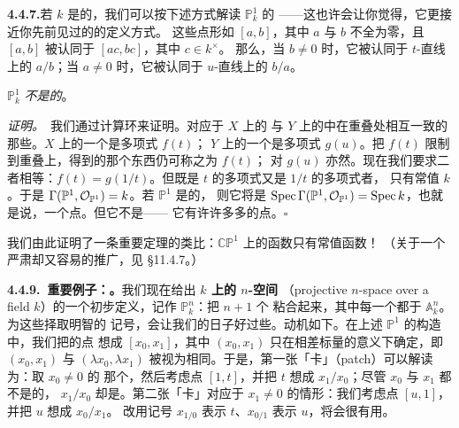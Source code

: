 \textbf{4.4.7.}\quad 若 $k$ 是\trAlgClosed{}的，我们可以按下述方式解读 $\mathbb{P}^1_k$ 的%
\trClosedPoint{}——这也许会让你觉得，它更接近你先前见过的\trProjectiveSpace{}的定义方式。%
这些点形如 $[a,b]$，其中 $a$ 与 $b$ 不全为零，且 $[a,b]$ 被认同于 $[ac,bc]$，其中 $c\in k^{\times}$。%
那么，当 $b\neq 0$ 时，它被认同于 $t$-直线上的 $a/b$；当 $a\neq 0$ 时，它被认同于 $u$-直线上的 $b/a$。

\begin{proposition}\label{thm:p1-not-affine}
$\mathbb{P}^1_k$ \emph{不是\trAffine{}的}。
\end{proposition}

\emph{证明。}\ 我们通过计算\trGlobalSections{}环来证明。\trGlobalSections{}对应于 $X$ 上的\trSection{}%
与 $Y$ 上的\trSection{}中在重叠处相互一致的那些。$X$ 上的一个\trSection{}是多项式 $f(t)$；%
$Y$ 上的一个\trSection{}是多项式 $g(u)$。把 $f(t)$ 限制到重叠上，得到的那个东西仍可称之为 $f(t)$；%
对 $g(u)$ 亦然。现在我们要求二者相等：$f(t)=g(1/t)$。但既是 $t$ 的多项式又是 $1/t$ 的多项式者，%
只有常值 $k$。于是 $\Gamma(\mathbb{P}^1,\mathcal{O}_{\mathbb{P}^1})=k$。若 $\mathbb{P}^1$ 是\trAffine{}的，%
则它将是 $\operatorname{Spec}\Gamma(\mathbb{P}^1,\mathcal{O}_{\mathbb{P}^1})=\operatorname{Spec} k$，也就是说，一个点。但它不是——%
它有许许多多的点。\hfill$\square$

我们由此证明了一条重要定理的类比：$\mathbb{CP}^1$ 上的\trHolomorphic{}函数只有常值函数！%
（关于一个严肃却又容易的推广，见 \S11.4.7。）

\textbf{4.4.9.\ 重要例子：\trProjectiveSpace。}\quad 我们现在给出\textbf{\trField{} $k$ 上的\trProjective{} $n$-空间}%
（projective $n$-space over a field $k$）的一个初步定义，记作 $\mathbb{P}^n_k$：把 $n+1$ 个%
\trOpenSet{}粘合起来，其中每一个都\trIsomorphic{}于 $\mathbb{A}^n_k$。为这些\trOpenSet{}择取明智的%
记号，会让我们的日子好过些。动机如下。在上述 $\mathbb{P}^1$ 的构造中，我们把\trProjectiveSpace{}的点%
想成 $[x_0,x_1]$，其中 $(x_0,x_1)$ 只在相差标量的意义下确定，即 $(x_0,x_1)$ 与%
$(\lambda x_0,\lambda x_1)$ 被视为相同。于是，第一张「卡」（patch）可以解读为：取 $x_0\neq 0$ 的%
那个\trLocus，然后考虑点 $[1,t]$，并把 $t$ 想成 $x_1/x_0$；尽管 $x_0$ 与 $x_1$ 都不是\trWellDefined{}的，%
$x_1/x_0$ 却是。第二张「卡」对应于 $x_1\neq 0$ 的情形：我们考虑点 $[u,1]$，并把 $u$ 想成 $x_0/x_1$。%
改用记号 $x_{1/0}$ 表示 $t$、$x_{0/1}$ 表示 $u$，将会很有用。

